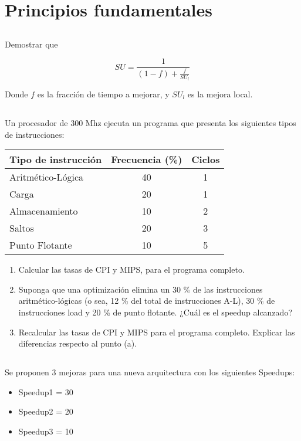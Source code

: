 \section{Principios fundamentales}
\subsection{}
Demostrar que 

						 $$ SU = \frac {1} {(1-f) + \frac {f}{SU_l}} $$


Donde $f$ es la fracción de tiempo a mejorar, y $SU_l$ es la mejora local.

\subsection{}

Un procesador de 300 Mhz ejecuta un programa que presenta los siguientes tipos de instrucciones:

\begin{table}[h!]
\begin{tabular}{|l|c|c|}
\hline
 Tipo de instrucción & Frecuencia (\%)  &  Ciclos  \\ \hline
 Aritmético-Lógica & 40  &  1  \\ \hline
 Carga & 20 & 1 \\ \hline
 Almacenamiento & 10  & 2  \\ \hline
 Saltos & 20  & 3 \\ \hline
 Punto Flotante & 10 & 5  \\ \hline
\end{tabular}
\end{table}

\begin{enumerate}[label=\alph*)]
 \item Calcular las tasas de CPI y MIPS, para el programa completo.
 \item Suponga que una optimización elimina un 30 \% de las instrucciones aritmético-lógicas (o sea, 12 \% del total de instrucciones A-L), 30 \% de instrucciones load y 20 \% de punto flotante. ¿Cuál es el speedup alcanzado?
 \item Recalcular las tasas de CPI y MIPS para el programa completo. Explicar las diferencias respecto al punto (a).
\end{enumerate}

\subsection{}
Se proponen 3 mejoras para una nueva arquitectura con los siguientes Speedups:
\begin{itemize}
\item Speedup1 = 30
\item Speedup2 = 20
\item Speedup3 = 10
\end{itemize}


